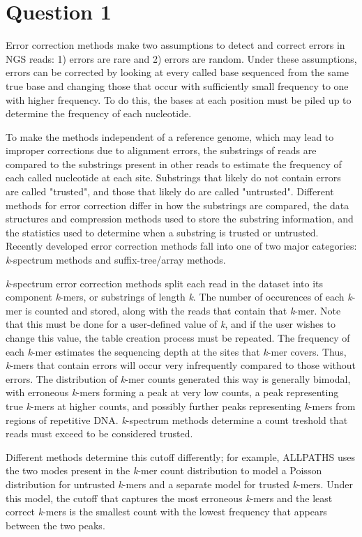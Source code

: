 \section{Question 1}
Error correction methods make two assumptions to detect and correct errors in NGS reads: 1) errors are rare and 2) errors are random. Under these assumptions, errors can be corrected by looking at every called base sequenced from the same true base and changing those that occur with sufficiently small frequency to one with higher frequency.
To do this, the bases at each position must be piled up to determine the frequency of each nucleotide.

To make the methods independent of a reference genome, which may lead to improper corrections due to alignment errors, the substrings of reads are compared to the substrings present in other reads to estimate the frequency of each called nucleotide at each site.
Substrings that likely do not contain errors are called "trusted", and those that likely do are called "untrusted".
Different methods for error correction differ in how the substrings are compared, the data structures and compression methods used to store the substring information, and the statistics used to determine when a substring is trusted or untrusted.
Recently developed error correction methods fall into one of two major categories: \textit{k}-spectrum methods and suffix-tree/array methods.

\textit{k}-spectrum error correction methods split each read in the dataset into its component \textit{k}-mers, or substrings of length \textit{k}. The number of occurences of each \textit{k}-mer is counted and stored, along with the reads that contain that \textit{k}-mer. Note that this must be done for a user-defined value of \textit{k}, and if the user wishes to change this value, the table creation process must be repeated.
The frequency of each \textit{k}-mer estimates the sequencing depth at the sites that \textit{k}-mer covers. Thus, \textit{k}-mers that contain errors will occur very infrequently compared to those without errors.
The distribution of \textit{k}-mer counts generated this way is generally bimodal, with erroneous \textit{k}-mers forming a peak at very low counts, a peak representing true \textit{k}-mers at higher counts, and possibly further peaks representing \textit{k}-mers from regions of repetitive DNA. \textit{k}-spectrum methods determine a count treshold that reads must exceed to be considered trusted.

Different methods determine this cutoff differently; for example,
ALLPATHS \parencite{butler_allpaths:_2008} uses the two modes present in the \textit{k}-mer count distribution to model a Poisson distribution for untrusted \textit{k}-mers and a separate model for trusted \textit{k}-mers. Under this model, the cutoff that captures the most erroneous \textit{k}-mers and the least correct \textit{k}-mers is the smallest count with the lowest frequency that appears between the two peaks.

